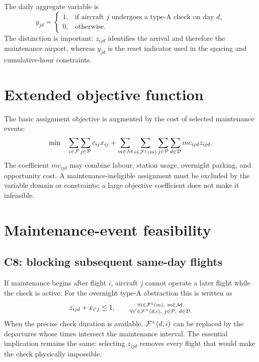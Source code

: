 The daily aggregate variable is
\begin{equation}
    y_{jd}=
    \begin{cases}
        1, & \text{if aircraft $j$ undergoes a type-A check on day $d$},\\
        0, & \text{otherwise.}
    \end{cases}
    \label{eq:maint_day_variable}
\end{equation}
The distinction is important: $z_{ijd}$ identifies the arrival and therefore
the maintenance airport, whereas $y_{jd}$ is the reset indicator used in the
spacing and cumulative-hour constraints.

\section{Extended objective function}

The basic assignment objective is augmented by the cost of selected
maintenance events:
\begin{equation}
    \min\quad
    \sum_{i\in\mathcal{F}}\sum_{j\in\mathcal{P}}c_{ij}x_{ij}
    +\sum_{m\in\mathcal{M}}\sum_{i\in\mathcal{F}^{\downarrow}(m)}
      \sum_{j\in\mathcal{P}}\sum_{d\in\mathcal{D}}mc_{ijd}z_{ijd}.
    \label{eq:maintenance_objective}
\end{equation}
The coefficient $mc_{ijd}$ may combine labour, station usage, overnight
parking, and opportunity cost. A maintenance-ineligible assignment must be
excluded by the variable domain or constraints; a large objective coefficient
does not make it infeasible.

\section{Maintenance-event feasibility}

\subsection{C8: blocking subsequent same-day flights}

If maintenance begins after flight $i$, aircraft $j$ cannot operate a later
flight while the check is active. For the overnight type-A abstraction this is
written as
\begin{equation}
    z_{ijd}+x_{i'j}\leq1,
    \qquad
    \substack{\forall i\in\mathcal{F}^{\downarrow}(m),\ m\in\mathcal{M},\\
    \forall i'\in\mathcal{F}^{+}(d,i),\ j\in\mathcal{P},\ d\in\mathcal{D}.}
    \label{eq:maint_c8}
\end{equation}
When the precise check duration is available, $\mathcal{F}^{+}(d,i)$ can be replaced
by the departures whose times intersect the maintenance interval. The
essential implication remains the same: selecting $z_{ijd}$ removes every
flight that would make the check physically impossible.

